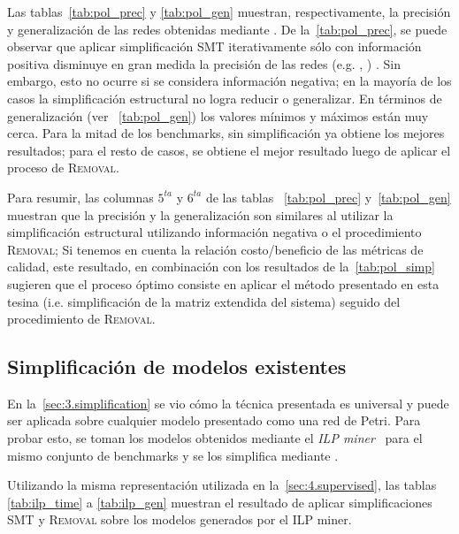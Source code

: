 Las tablas~\ref{tab:pol_prec} y \ref{tab:pol_gen} muestran, respectivamente, la precisión y generalización de las redes
obtenidas mediante \pachtool. De la~\autoref{tab:pol_prec}, se puede observar que 
aplicar simplificación SMT iterativamente sólo con información positiva disminuye en gran medida la precisión de las
redes (e.g. , ) . Sin embargo, esto no ocurre si se considera 
información negativa; en la mayoría de los casos la simplificación estructural no logra reducir o generalizar.
En términos de generalización (ver ~\autoref{tab:pol_gen}) los valores mínimos y máximos están muy 
cerca. Para la mitad de los benchmarks, \pachtool sin simplificación ya obtiene los mejores resultados;
para el resto de casos, se obtiene el mejor resultado luego de aplicar el proceso de \textsc{Removal}.



Para resumir, las columnas $5^{ta}$ y $6^{ta}$ de las tablas ~\ref{tab:pol_prec} y~\ref{tab:pol_gen} muestran que 
la precisión y la generalización son similares al utilizar la simplificación estructural utilizando información 
negativa o el procedimiento \textsc{Removal}; 
Si tenemos en cuenta la relación costo/beneficio de las métricas de calidad, este resultado,
en combinación con los resultados de la~\autoref{tab:pol_simp}
sugieren que el proceso óptimo consiste en aplicar el método presentado en esta tesina (i.e. simplificación de la matriz 
extendida del sistema) seguido del procedimiento de \textsc{Removal}.



\subsection{Simplificación de modelos existentes}
\label{sec:4.simp_existing}

En la~\autoref{sec:3.simplification} se vio cómo la técnica presentada es universal y puede ser aplicada sobre
cualquier modelo presentado como una red de Petri. Para probar esto, se toman los modelos obtenidos
mediante el \textit{ILP miner}~\cite{WDHS08} para el mismo conjunto de benchmarks y se los simplifica mediante
\pachtool.

Utilizando la misma representación utilizada en la~\autoref{sec:4.supervised}, las tablas \ref{tab:ilp_time} a
\ref{tab:ilp_gen} muestran el resultado de aplicar simplificaciones SMT y \textsc{Removal} sobre los
modelos generados por el ILP miner.


